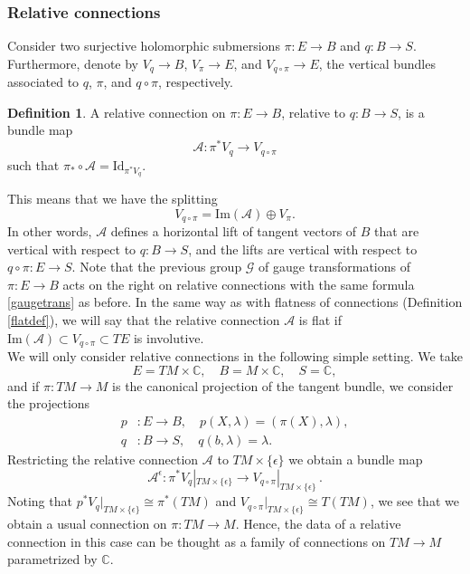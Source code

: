 \documentclass{article}
\theoremstyle{definition}
\newtheorem{definition}[theorem]{Definition}
\numberwithin{equation}{section}
\begin{document}
\subsubsection{Relative connections}

Consider two surjective holomorphic submersions $\pi:E\to B$ and $q:B\to S$. Furthermore, denote by $V_{q}\to B$, $V_{\pi}\to E$, and  $V_{q\circ \pi}\to E$, the vertical bundles associated to $q$, $\pi$, and $q\circ \pi$, respectively. 

\begin{definition} A relative  connection on $\pi:E\to B$, relative to $q:B\to S$, is a bundle map 
\begin{equation*}
    \mathcal{A}:\pi^*V_q\to V_{q\circ \pi}
\end{equation*}
such that $\pi_*\circ \mathcal{A}=\text{Id}_{\pi^*V_q}$.\end{definition}
This means that we have the splitting
\begin{equation*}
    V_{q\circ \pi}=\text{Im}(\mathcal{A})\oplus V_{\pi}.
\end{equation*}
In other words, $\mathcal{A}$ defines a horizontal lift of tangent vectors of $B$ that are vertical with respect to $q:B\to S$, and the lifts are vertical with respect to $q\circ \pi:E\to S$. Note that the previous group $\mathcal{G}$ of gauge transformations of $\pi:E\to B$ acts on the right on relative connections with the same formula \eqref{gaugetrans} as before.  In the same way as with flatness of connections (Definition \ref{flatdef}), we will say that the relative connection $\mathcal{A}$ is flat if $\text{Im}(\mathcal{A})\subset V_{q\circ \pi}\subset TE$ is involutive.\\

We will only consider relative connections in the following simple setting. We take
\begin{equation*}
    E = TM\times \mathbb{C}, \quad B=M\times \mathbb{C}, \quad S= \mathbb{C},
\end{equation*}
and if $\pi:TM\to M$ is the canonical projection of the tangent bundle, we consider the projections
\begin{equation*}
\begin{split}
    p&:E\to B, \quad p(X,\lambda)=(\pi(X),\lambda),\\
    q&:B \to S, \quad q(b,\lambda)=\lambda.
\end{split}
\end{equation*}
Restricting the relative connection $\mathcal{A}$ to $TM\times \{\epsilon\}$ we obtain a bundle map 
\begin{equation*}
    \mathcal{A}^{\epsilon}:\pi^*V_q|_{TM\times \{\epsilon\}}\to V_{q\circ \pi}|_{TM\times \{\epsilon\}}\,.
\end{equation*}
Noting that $p^*V_q|_{TM\times \{\epsilon\}}\cong \pi^*(TM)$ and $V_{q\circ \pi}|_{TM\times \{\epsilon\}}\cong T(TM)$, we see that we obtain a usual connection on $\pi: TM\to M$. Hence, the data of a relative connection in this case can be thought as a family of connections on $TM\to M$ parametrized by $\mathbb{C}$.
\end{document}
